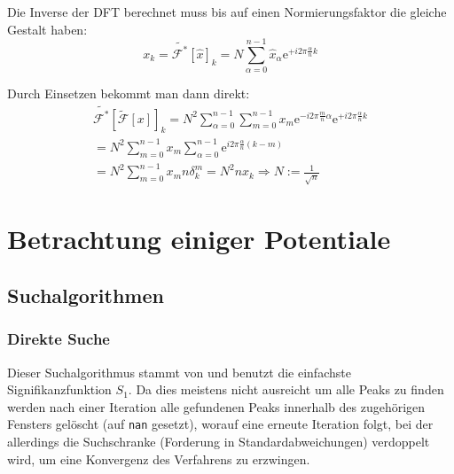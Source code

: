 \documentclass[10pt,a4paper,german]{scrartcl}
\begin{document}
		Die Inverse der DFT berechnet muss bis auf einen Normierungsfaktor die gleiche
		Gestalt haben:
		\begin{equation}
		\label{eq:idft}
			x_k
			= \tilde{\mathcal{F}^{*}}[\hat{x}]_k
			= N \sum_{\alpha=0}^{n-1} \hat{x}_\alpha \mathrm{e}^{+ i 2\pi \frac{\alpha}{n} k}
		\end{equation}

		Durch Einsetzen bekommt man dann direkt:
		\begin{multline*}
			\tilde{\mathcal{F}^{*}}[\tilde{\mathcal{F}}[x]]_k
			= N^2 \sum_{\alpha=0}^{n-1}
				\sum_{m=0}^{n-1} x_m \mathrm{e}^{- i 2\pi \frac{m}{n} \alpha}
		 	\mathrm{e}^{+ i 2\pi \frac{\alpha}{n} k} \\
		 	= N^2 \sum_{m=0}^{n-1} x_m
		 	  \sum_{\alpha=0}^{n-1}	\mathrm{e}^{i 2\pi \frac{\alpha}{n}(k-m)}\\
		 	= N^2 \sum_{m=0}^{n-1} x_m
		 	  n \delta^m_k
		 	= N^2 n x_k \Rightarrow N := \frac{1}{\sqrt{n}}
		\end{multline*}

  \section{Betrachtung einiger Potentiale}
  	\subsection{Suchalgorithmen}
  	  \subsubsection*{Direkte Suche}
  			Dieser Suchalgorithmus stammt von \cite{SAPS} und benutzt die
  			einfachste Signifikanzfunktion $S_1$. Da dies meistens nicht ausreicht um
  			alle Peaks zu finden werden nach einer Iteration alle gefundenen Peaks
	  		innerhalb des zugehörigen Fensters gelöscht (auf \verb!nan! gesetzt), 
  			worauf eine erneute Iteration folgt, bei der allerdings die Suchschranke 
	  		(Forderung in Standardabweichungen)
		  	verdoppelt wird, um eine Konvergenz des Verfahrens zu erzwingen.
			
\end{document}
